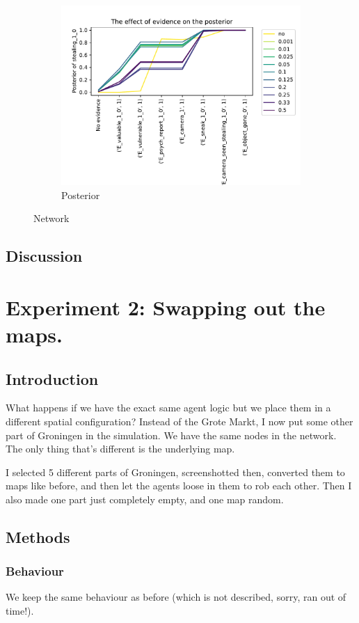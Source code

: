 \begin{figure}[htbp]
\begin{subfigure}{.5\textwidth}
\includegraphics[width=.7\linewidth]{../experiments/GroteMarkt/plots/posterior_GroteMarkt.pdf}
\caption{Posterior}
\label{groteMarktperfo}
\end{subfigure}


\caption{Network}
\end{figure}

\subsection{Discussion}

\section{Experiment 2: Swapping out the maps.}

\subsection{Introduction}
What happens if we have the exact same agent logic but we place them in a different spatial configuration? Instead of the Grote Markt, I now put some other part of Groningen in the simulation. We have the same nodes in the network. The only thing that's different is the underlying map.

I selected 5 different parts of Groningen, screenshotted then, converted them to maps like before, and then let the agents loose in them to rob each other.  Then I also made one part just completely empty, and one map random.

\subsection{Methods}

\subsubsection{Behaviour}
We keep the same behaviour as before (which is not described, sorry, ran out of time!).

